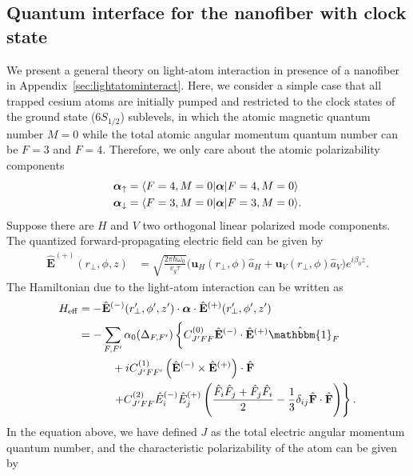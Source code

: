 \documentclass[preprint,aps,pra,onecolumn]{revtex4-1} %
\renewcommand{\tensor}[1]{\boldsymbol{#1}}
\begin{document}
\subsection{Quantum interface for the nanofiber with clock state}
We present a general theory on light-atom interaction in presence of a nanofiber in Appendix~\ref{sec:lightatominteract}. Here, we consider a simple case that all trapped cesium atoms are initially pumped and restricted to the clock states of the ground state ($6S_{1/2}$) sublevels, in which the atomic magnetic quantum number $M=0$ while the total atomic angular momentum quantum number can be $F=3$ and $F=4$. Therefore, we only care about the atomic polarizability components
\begin{align}
\tensor{\alpha}_{\uparrow} &=\bra{F=4,M=0}\tensor{\alpha}\ket{F=4,M=0}\\
\tensor{\alpha}_{\downarrow} &=\bra{F=3,M=0}\tensor{\alpha}\ket{F=3,M=0}.
\end{align}
Suppose there are $H$ and $V$ two orthogonal linear polarized mode components. The quantized forward-propagating electric field can be given by
\begin{align}
\hat{\mathbf{E}}^{(+)}(r\!_\perp,\phi,z) &= \sqrt{ \frac{2 \pi \hbar \omega_0}{ v_g \tau} } \big( \mathbf{u}_H(r\!_\perp,\phi) \hat{a}_H + \mathbf{u}_V(r\!_\perp,\phi) \hat{a}_V \big) e^{i \beta_0 z}.
\end{align}
The Hamiltonian due to the light-atom interaction can be written as
\begin{align}
H_{\rm eff}   &= -\hat{\mathbf{E}}^{(-)}(r^\prime\!\!_\perp,\phi',z')\cdot \tensor{\alpha}\cdot 
\hat{\mathbf{E}}^{(+)}(r^\prime\!\!_\perp,\phi',z') \label{eq:Heff_0}\\
 &=- \sum_{F,F'}\alpha_0(\Delta_{F,F'}) \left\{ C_{J'FF}^{(0)} \hat{\mathbf{E}}^{(-)} \cdot \hat{\mathbf{E}}^{(+)} \hat{\mathbbm{1}}_F \phantom{\frac{\hat{1}}{1}}\right. \nonumber\\
&\quad\quad\quad + i C_{J'FF'}^{(1)} \left(\hat{\mathbf{E}}^{(-)} \times \hat{\mathbf{E}}^{(+)} \right) \cdot \hat{ \mathbf{F}} \nonumber\\
&\quad\quad\quad  \left. + C_{J'FF}^{(2)} \hat{E}_i^{(-)} \hat{E}_j^{(+)} \left( \frac{ \hat{F}_i \hat{F}_j  + \hat{F}_j \hat{F}_i  }{2} - \frac{1}{3}\delta_{ij} \hat{ \mathbf{F}} \cdot \hat{\mathbf{F}}  \right) \right\}. 
\end{align}
In the equation above, we have defined $ J $ as the total electric angular momentum quantum number, and the characteristic polarizability of the atom can be given by
\end{document}
